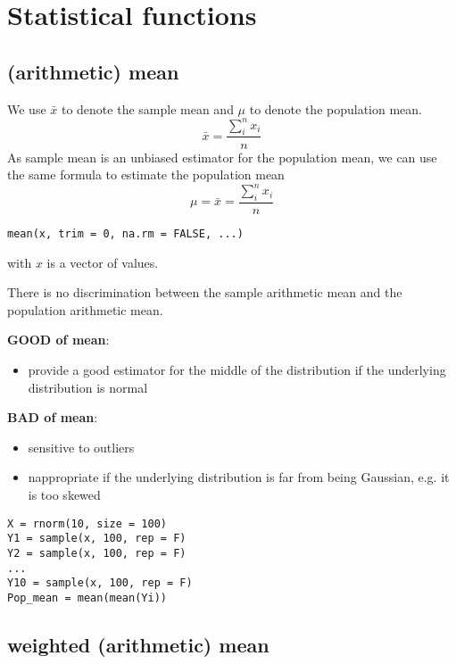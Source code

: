  

\section{Statistical functions}
\label{sec:stat-funct}



\subsection{(arithmetic) mean}
\label{sec:arithmetic-mean}

We use $\bar{x}$ to denote the sample mean and $\mu$ to denote the
population mean.
\begin{equation}
  \label{eq:5}
  \bar{x} = \frac{\sum_i^n x_i}{n}
\end{equation}
As sample mean is an unbiased estimator for the population mean, we
can use the same formula to estimate the population mean
\begin{equation}
  \label{eq:36}
  \mu = \bar{x} = \frac{\sum_i^n x_i}{n}
\end{equation}

\begin{verbatim}
mean(x, trim = 0, na.rm = FALSE, ...)
\end{verbatim}
with $x$ is a vector of values.


There is no discrimination between the sample arithmetic mean and the
population arithmetic mean.


{\bf GOOD of mean}:
\begin{itemize}
\item provide a good estimator for the middle of the distribution if the underlying distribution is normal 
\end{itemize}

{\bf BAD of mean}:
\begin{itemize}
\item sensitive to outliers
\item nappropriate if the underlying distribution is far from being
  Gaussian, e.g. it is too skewed
\end{itemize}

\begin{lstlisting}
X = rnorm(10, size = 100)
Y1 = sample(x, 100, rep = F)
Y2 = sample(x, 100, rep = F)
...
Y10 = sample(x, 100, rep = F)
Pop_mean = mean(mean(Yi))
\end{lstlisting}


\subsection{weighted (arithmetic) mean}
\label{sec:weight-arithm-mean}


